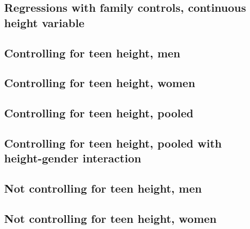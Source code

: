 \begin{landscape}
\section{Regressions with family controls, continuous height variable}
\subsection{Controlling for teen height, men}

\end{landscape}

\begin{landscape}
\subsection{Controlling for teen height, women}

\end{landscape}

\begin{landscape}
\subsection{Controlling for teen height, pooled}

\end{landscape}

\begin{landscape}
\subsection{Controlling for teen height, pooled with height-gender interaction}

\end{landscape}

\begin{landscape}
\subsection{Not controlling for teen height, men}

\end{landscape}

\begin{landscape}
\subsection{Not controlling for teen height, women}

\end{landscape}

